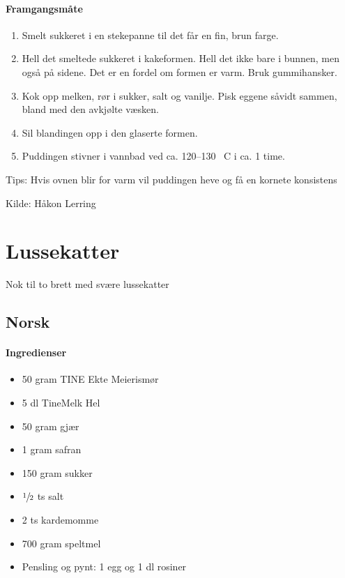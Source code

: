 \documentclass[12pt,a4paper]{book}
\begin{document}
\paragraph{Framgangsmåte}
\begin{enumerate}
	\item Smelt sukkeret i en stekepanne til det får en fin, brun farge. \item Hell det smeltede sukkeret i kakeformen. Hell det ikke bare i bunnen, men også på sidene. Det er en fordel om formen er varm. Bruk gummihansker.
	\item Kok opp melken, rør i sukker, salt og vanilje. Pisk eggene såvidt sammen, bland med den avkjølte væsken.
	\item Sil blandingen opp i den glaserte formen.
	\item Puddingen stivner i vannbad ved ca. 120--130 \degree~C i ca. 1 time.

\end{enumerate}


Tips: Hvis ovnen blir for varm vil puddingen heve og få en kornete konsistens


Kilde: Håkon Lerring
\clearpage{}
\clearpage{}\section{﻿Lussekatter}
Nok til to brett med svære lussekatter
\subsection{Norsk}

\paragraph{Ingredienser}
\begin{itemize}[noitemsep]
	\item 50 gram TINE Ekte Meierismør
	\item 5 dl TineMelk Hel
	\item 50 gram gjær
	\item 1 gram safran
	\item 150 gram sukker
	\item $\sfrac{1}{2}$ ts salt
	\item 2 ts kardemomme
	\item 700 gram speltmel
	\item Pensling og pynt: 1 egg og 1 dl rosiner
\end{itemize}
\end{document}
